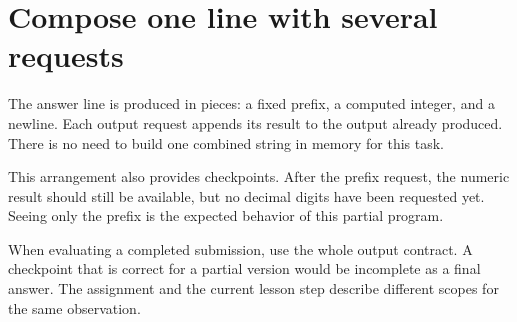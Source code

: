 \section{Compose one line with several
  requests}\label{001-console-calculation-p13-compose-one-line-with-several-requests}

The answer line is produced in pieces: a fixed prefix, a computed
integer, and a newline. Each output request appends its result to the
output already produced. There is no need to build one combined string
in memory for this task.

This arrangement also provides checkpoints. After the prefix request,
the numeric result should still be available, but no decimal digits have
been requested yet. Seeing only the prefix is the expected behavior of
this partial program.

When evaluating a completed submission, use the whole output contract. A
checkpoint that is correct for a partial version would be incomplete as
a final answer. The assignment and the current lesson step describe
different scopes for the same observation.
